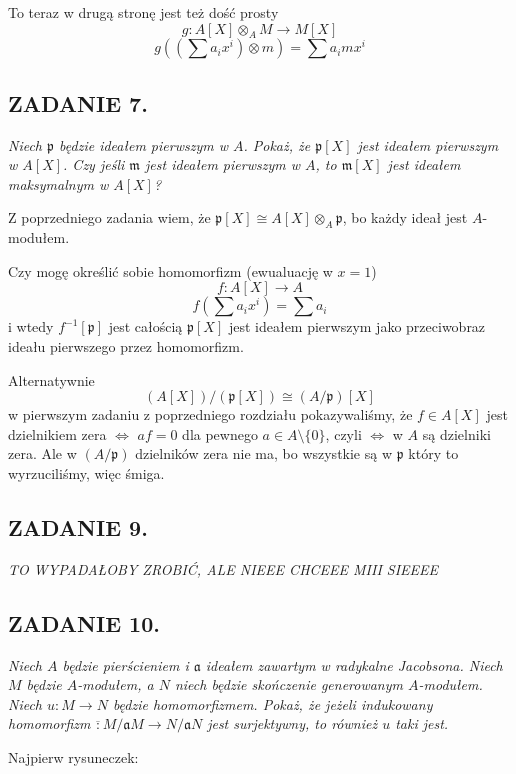 \documentclass{article}
\begin{document}
To teraz w drugą stronę jest też dość prosty
$$g:A[X]\otimes_AM\to M[X]$$
$$g(\left(\sum a_ix^i\right)\otimes m)=\sum a_imx^i$$

\subsection*{ZADANIE 7.}
{\color{yellow}\emph{Niech $\mathfrak{p}$ będzie ideałem pierwszym w $A$. Pokaż, że $\mathfrak{p}[X]$ jest ideałem pierwszym w $A[X]$. Czy jeśli $\mathfrak{m}$ jest ideałem pierwszym w $A$, to $\mathfrak{m}[X]$ jest ideałem maksymalnym w $A[X]$?}}
\smallskip

Z poprzedniego zadania wiem, że $\mathfrak{p}[X]\cong A[X]\otimes_A\mathfrak{p}$, bo każdy ideał jest $A$-modułem.

Czy mogę określić sobie homomorfizm (ewualuację w $x=1$)
$$f:A[X]\to A$$
$$f(\sum a_ix^i)=\sum a_i$$
i wtedy $f^{-1}[\mathfrak{p}]$ jest całością $\mathfrak{p}[X]$ jest ideałem pierwszym jako przeciwobraz ideału pierwszego przez homomorfizm. 

Alternatywnie
$$(A[X])/(\mathfrak{p}[X])\cong (A/\mathfrak{p})[X]$$
w pierwszym zadaniu z poprzedniego rozdziału pokazywaliśmy, że $f\in A[X]$ jest dzielnikiem zera $\iff$ $af=0$ dla pewnego $a\in A\setminus\{0\}$,
czyli $\iff$ w $A$ są dzielniki zera.
Ale w $(A/\mathfrak{p})$ dzielników zera nie ma, bo wszystkie są w $\mathfrak{p}$ który to wyrzuciliśmy, więc śmiga.

\subsection*{ZADANIE 9.}
\emph{\color{yellow}TO WYPADAŁOBY ZROBIĆ, ALE NIEEE CHCEEE MIII SIEEEE}



\subsection*{ZADANIE 10.}
\emph{\color{blue}Niech $A$ będzie pierścieniem i $\mathfrak{a}$ ideałem zawartym w radykalne Jacobsona. Niech $M$ będzie $A$-modułem, a $N$ niech będzie skończenie generowanym $A$-modułem. Niech $u:M\to N$ będzie homomorfizmem. Pokaż, że jeżeli indukowany homomorfizm $\overline:M/\mathfrak{a}M\to N/\mathfrak{a}N$ jest surjektywny, to również $u$ taki jest.}

Najpierw rysuneczek:

\begin{center}
\end{center}
\end{document}
